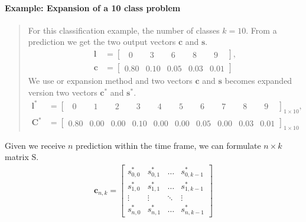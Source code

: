 \paragraph{Example: Expansion of a 10 class problem} 
\blockquote[]{	 	
	For this classification example, the number of classes $k=10$. From a prediction we get the two output vectors $\mathbf{c}$ and $\mathbf{s}$.
	\begin{align*}
	\mathbf{l} &= \begin{bmatrix}
	\phantom{0}0\phantom{.0} & \phantom{0}3\phantom{.0} & \phantom{0}6\phantom{.0} & \phantom{0}8\phantom{.0} & \phantom{0}9\phantom{.0}
	\end{bmatrix},\\
	\mathbf{c} &= \begin{bmatrix}
	0.80 & 0.10 & 0.05 & 0.03 & 0.01
	\end{bmatrix}
	\end{align*}
	We use or expansion method and two vectors $\mathbf{c}$ and $\mathbf{s}$ becomes expanded version two vectors $\mathbf{c^*}$ and $\mathbf{s^*}$.
	\begin{align*}
	\mathbf{l^*} &= \begin{bmatrix}
	\phantom{0}0\phantom{.0} & \phantom{0}1\phantom{.0} & \phantom{0}2\phantom{.0} & \phantom{0}3\phantom{.0} & \phantom{0}4\phantom{.0} & \phantom{0}5\phantom{.0} & \phantom{0}6\phantom{.0} & \phantom{0}7\phantom{.0} & \phantom{0}8\phantom{.0} & \phantom{0}9\phantom{.0}
	\end{bmatrix}_{1 \times 10},\\
	\mathbf{C^*} &= \begin{bmatrix}
	0.80 & 0.00 & 0.00 & 0.10 & 0.00 & 0.00 & 0.05 & 0.00 & 0.03 & 0.01
	\end{bmatrix}_{1 \times 10}
	\end{align*}
}
Given we receive $n$ prediction within the time frame, we can formulate $n \times k$ matrix S. 
\begin{align*}
\mathbf{c}_{n,k} = \begin{bmatrix}
s^*_{0,0} & s^*_{0,1} & \dots  & s^*_{0,k-1} 	\\
s^*_{1,0} & s^*_{1,1} & \dots  & s^*_{1,k-1}	\\
\vdots 	& \vdots  & \ddots & \vdots 	\\
s^*_{n,0} & s^*_{n,1} & \dots  & s^*_{n,k-1}
\end{bmatrix}
\end{align*}      



